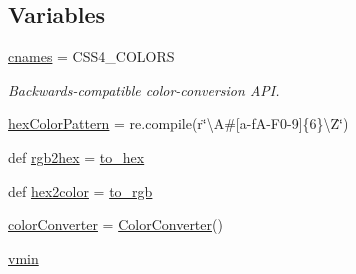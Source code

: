 \subsection*{Variables}
\begin{DoxyCompactItemize}
\item 
\hyperlink{namespacematplotlib_1_1colors_a5786340f4f4fddf7665e5246eaf75d68}{cnames} = C\+S\+S4\+\_\+\+C\+O\+L\+O\+RS
\begin{DoxyCompactList}\small\item\em Backwards-\/compatible color-\/conversion A\+PI. \end{DoxyCompactList}\item 
\hyperlink{namespacematplotlib_1_1colors_af26cd70a131ac31abe1aa77acf04c3d7}{hex\+Color\+Pattern} = re.\+compile(r\char`\"{}\textbackslash{}A\#\mbox{[}a-\/fA-\/F0-\/9\mbox{]}\{6\}\textbackslash{}Z\char`\"{})
\item 
def \hyperlink{namespacematplotlib_1_1colors_ac1f1c87b31eac3797245a61b5222aa7d}{rgb2hex} = \hyperlink{namespacematplotlib_1_1colors_a7ddf4279539e8252678d727599925336}{to\+\_\+hex}
\item 
def \hyperlink{namespacematplotlib_1_1colors_a14c6e2d10c728267bef28e5b3c9c3142}{hex2color} = \hyperlink{namespacematplotlib_1_1colors_a131bb01614d6474f3031c00026bd93ec}{to\+\_\+rgb}
\item 
\hyperlink{namespacematplotlib_1_1colors_ae0f1473cd90343845e171b405e1add8c}{color\+Converter} = \hyperlink{classmatplotlib_1_1colors_1_1ColorConverter}{Color\+Converter}()
\item 
\hyperlink{namespacematplotlib_1_1colors_a64fab219e2255adac7821722f85263bf}{vmin}
\end{DoxyCompactItemize}


